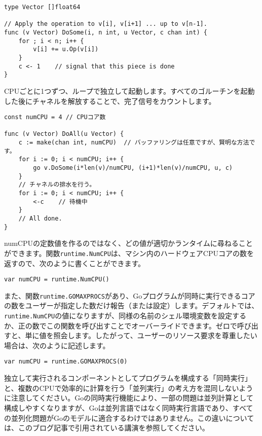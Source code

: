 \documentclass{jsarticle}
\begin{document}
\begin{lstlisting}[numbers=none]
type Vector []float64

// Apply the operation to v[i], v[i+1] ... up to v[n-1].
func (v Vector) DoSome(i, n int, u Vector, c chan int) {
    for ; i < n; i++ {
        v[i] += u.Op(v[i])
    }
    c <- 1    // signal that this piece is done
}
\end{lstlisting}

CPUごとに1つずつ、ループで独立して起動します。すべてのゴルーチンを起動した後にチャネルを解放することで、完了信号をカウントします。

\begin{lstlisting}[numbers=none]
const numCPU = 4 // CPUコア数

func (v Vector) DoAll(u Vector) {
    c := make(chan int, numCPU)  // バッファリングは任意ですが、賢明な方法です。
    for i := 0; i < numCPU; i++ {
        go v.DoSome(i*len(v)/numCPU, (i+1)*len(v)/numCPU, u, c)
    }
    // チャネルの排水を行う。
    for i := 0; i < numCPU; i++ {
        <-c    // 待機中
    }
    // All done.
}
\end{lstlisting}

numCPUの定数値を作るのではなく、どの値が適切かランタイムに尋ねることができます。関数{\texttt{runtime.NumCPU}}は、マシン内のハードウェアCPUコアの数を返すので、次のように書くことができます。

\begin{lstlisting}[numbers=none]
var numCPU = runtime.NumCPU()
\end{lstlisting}

また、関数{\texttt{runtime.GOMAXPROCS}}があり、Goプログラムが同時に実行できるコアの数をユーザーが指定した数だけ報告（または設定）します。デフォルトでは、\texttt{runtime.NumCPU}の値になりますが、同様の名前のシェル環境変数を設定するか、正の数でこの関数を呼び出すことでオーバーライドできます。ゼロで呼び出すと、単に値を照会します。したがって、ユーザーのリソース要求を尊重したい場合は、次のように記述します。

\begin{lstlisting}[numbers=none]
var numCPU = runtime.GOMAXPROCS(0)
\end{lstlisting}

独立して実行されるコンポーネントとしてプログラムを構成する「同時実行」と、複数のCPUで効率的に計算を行う「並列実行」の考え方を混同しないように注意してください。Goの同時実行機能により、一部の問題は並列計算として構成しやすくなりますが、Goは並列言語ではなく同時実行言語であり、すべての並列化問題がGoのモデルに適合するわけではありません。この違いについては、{このブログ記事}で引用されている講演を参照してください。
\end{document}
